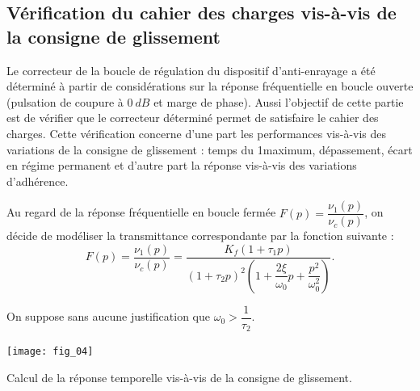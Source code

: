 
\subsection*{Vérification du cahier des charges vis-à-vis de la consigne de glissement}

Le correcteur de la boucle de régulation du dispositif d’anti-enrayage a été déterminé
à partir de considérations sur la réponse fréquentielle en boucle ouverte
(pulsation de coupure à  $\SI{0}{dB}$ et marge de phase). Aussi l’objectif de cette partie
est de vérifier que le correcteur déterminé permet de satisfaire le cahier des charges.
Cette vérification concerne d’une part les performances vis-à-vis des variations
de la consigne de glissement : temps du 1\ier maximum, dépassement, écart
en régime permanent et d’autre part la réponse vis-à-vis des variations d’adhérence.

Au regard de la réponse fréquentielle en boucle fermée $F(p)=\dfrac{\nu_1(p)}{\nu_c(p)}$, on décide de modéliser la transmittance correspondante par la fonction suivante : 
$$
F(p)=\dfrac{\nu_1(p)}{\nu_c(p)} = \dfrac{K_f\left(1+\tau_1 p\right)}{\left(1+\tau_2 p\right)^2 \left( 1+\dfrac{2\xi}{\omega_0}p + \dfrac{p^2}{\omega_0^2} \right)}.
$$

On suppose sans aucune justification que $\omega_0> \dfrac{1}{\tau_2}$. 


\begin{marginfigure}
\texttt{[image: fig\_04]}
\end{marginfigure}




\begin{obj}
Calcul de la réponse temporelle vis-à-vis de la consigne de glissement. 
\end{obj}

